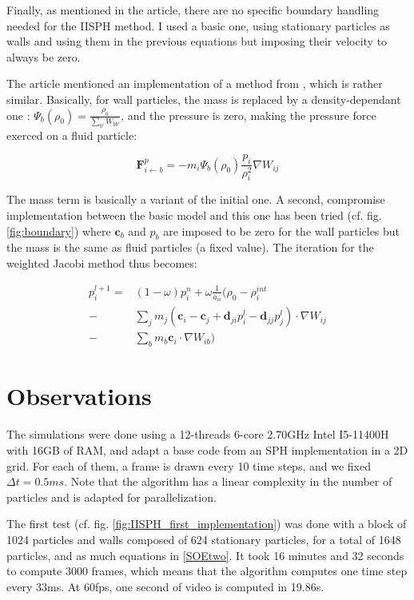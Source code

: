 \documentclass[acmtog, authorversion]{acmart}
\begin{document}
Finally, as mentioned in the article, there are no specific boundary handling needed for the IISPH method.
I used a basic one, using stationary particles as walls and using them in the previous equations but imposing their velocity to always be zero.

The article mentioned an implementation of a method from \cite{boundary}, which is rather similar.
Basically, for wall particles, the mass is replaced by a density-dependant one : $\Psi_b(\rho_0) = \frac{\rho_0}{\sum_{b'}W_{bb'}}$, and the pressure is zero, making the pressure force exerced on a fluid particle:

\begin{equation}
  \textbf{F}_{i\gets b}^p = -m_i\Psi_b(\rho_0)\frac{p_i}{\rho_i^2} \nabla W_{ij}
\end{equation}

The mass term is basically a variant of the initial one. A second, compromise implementation between the basic model and this one has been tried (cf. fig. \ref{fig:boundary}) where $\textbf{c}_b$ and $p_b$ are imposed to be zero for the wall particles but the mass is the same as fluid particles (a fixed value).
The iteration for the weighted Jacobi method thus becomes:

\begin{equation}
  \begin{aligned}
    p_i^{l+1} = & (1 - \omega) p_i^{n} + \omega \frac{1}{a_{ii}}\Bigg( \rho_0 - \rho_i^{int} \\
     - & \sum_{j} m_j \left( \textbf{c}_i - \textbf{c}_j + \textbf{d}_{ji}p_i^l - \textbf{d}_{jj}p_j^l \right)\cdot \nabla W_{ij} \\
- & \sum_{b}m_b\textbf{c}_i\cdot \nabla W_{ib}\Bigg)
  \end{aligned}
\end{equation}

\section{Observations}

The simulations were done using a 12-threads 6-core 2.70GHz Intel I5-11400H with 16GB of RAM, and adapt a base code from an SPH implementation in a 2D grid.
For each of them, a frame is drawn every 10 time steps, and we fixed $\Delta t = 0.5ms$. Note that the algorithm has a linear complexity in the number of particles and is adapted for parallelization.

The first test (cf. fig. \ref{fig:IISPH_first_implementation}) was done with a block of 1024 particles and walls composed of 624 stationary particles, for a total of 1648 particles, and as much equations in \eqref{SOEtwo}.
It took 16 minutes and 32 seconds to compute 3000 frames, which means that the algorithm computes one time step every 33ms.
At 60fps, one second of video is computed in 19.86s.\\
\end{document}
